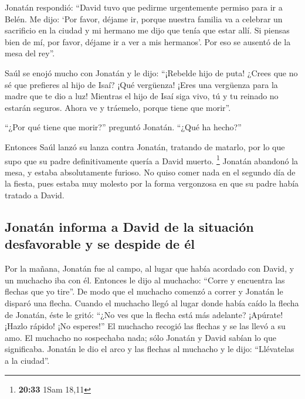  Jonatán respondió: ``David tuvo que pedirme urgentemente
permiso para ir a Belén.  Me dijo: `Por favor, déjame ir,
porque nuestra familia va a celebrar un sacrificio en la ciudad y mi
hermano me dijo que tenía que estar allí. Si piensas bien de mí, por
favor, déjame ir a ver a mis hermanos'. Por eso se ausentó de la mesa
del rey''.

 Saúl se enojó mucho con Jonatán y le dijo: ``¡Rebelde
hijo de puta! ¿Crees que no sé que prefieres al hijo de Isaí? ¡Qué
vergüenza! ¡Eres una vergüenza para la madre que te dio a luz!
 Mientras el hijo de Isaí siga vivo, tú y tu reinado no
estarán seguros. Ahora ve y tráemelo, porque tiene que morir''.

 ``¿Por qué tiene que morir?'' preguntó Jonatán. ``¿Qué
ha hecho?''

 Entonces Saúl lanzó su lanza contra Jonatán, tratando de
matarlo, por lo que supo que su padre definitivamente quería a David
muerto. \footnote{\textbf{20:33} 1Sam 18,11}  Jonatán
abandonó la mesa, y estaba absolutamente furioso. No quiso comer nada en
el segundo día de la fiesta, pues estaba muy molesto por la forma
vergonzosa en que su padre había tratado a David.

\hypertarget{jonatuxe1n-informa-a-david-de-la-situaciuxf3n-desfavorable-y-se-despide-de-uxe9l}{%
\subsection{Jonatán informa a David de la situación desfavorable y se
despide de
él}\label{jonatuxe1n-informa-a-david-de-la-situaciuxf3n-desfavorable-y-se-despide-de-uxe9l}}

 Por la mañana, Jonatán fue al campo, al lugar que había
acordado con David, y un muchacho iba con él.  Entonces
le dijo al muchacho: ``Corre y encuentra las flechas que yo tire''. De
modo que el muchacho comenzó a correr y Jonatán le disparó una flecha.
 Cuando el muchacho llegó al lugar donde había caído la
flecha de Jonatán, éste le gritó: ``¿No ves que la flecha está más
adelante?  ¡Apúrate! ¡Hazlo rápido! ¡No esperes!'' El
muchacho recogió las flechas y se las llevó a su amo.  El
muchacho no sospechaba nada; sólo Jonatán y David sabían lo que
significaba.  Jonatán le dio el arco y las flechas al
muchacho y le dijo: ``Llévatelas a la ciudad''.

